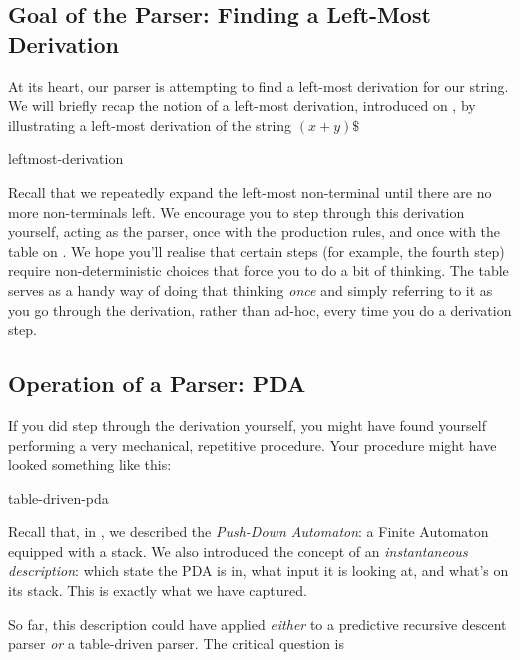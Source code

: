 \subsection{Goal of the Parser: Finding a Left-Most Derivation}\label{section:recap-left-most-deriv}
At its heart, our parser is attempting to find a left-most derivation for our string. We will briefly recap the notion of a left-most derivation, introduced on , by illustrating a left-most derivation of the string $(x + y)\$$

\begin{center}
    {leftmost-derivation}
\end{center}

Recall that we repeatedly expand the left-most non-terminal until there are no more non-terminals left. We encourage you to step through this derivation yourself, acting as the parser, once with the production rules, and once with the table on . We hope you'll realise that certain steps (for example, the fourth step) require non-deterministic choices that force you to do a bit of thinking. The table serves as a handy way of doing that thinking \textit{once} and simply referring to it as you go through the derivation, rather than ad-hoc, every time you do a derivation step.

\subsection{Operation of a Parser: PDA}\label{section:recap-pda-operation}
If you did step through the derivation yourself, you might have found yourself performing a very mechanical, repetitive procedure. Your procedure might have looked something like this:

\begin{center}
    {table-driven-pda}
\end{center}

Recall that, in , we described the \textit{Push-Down Automaton}: a Finite Automaton equipped with a stack. We also introduced the concept of an \textit{instantaneous description}: which state the PDA is in, what input it is looking at, and what's on its stack. This is exactly what we have captured. 

So far, this description could have applied \textit{either} to a predictive recursive descent parser \textit{or} a table-driven parser. The critical question is 

